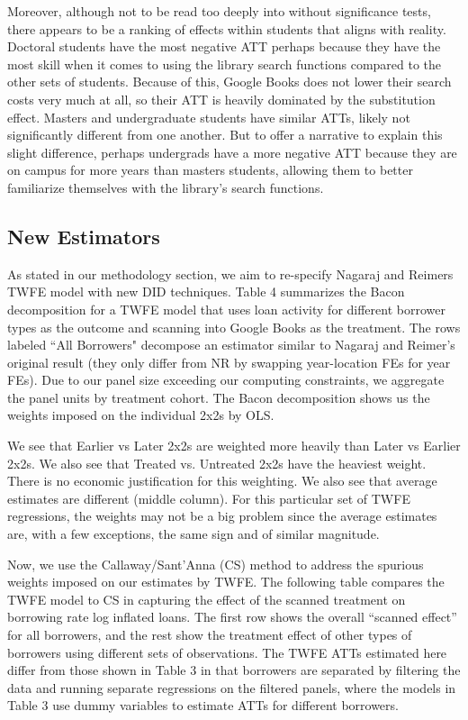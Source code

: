 \documentclass{article}
\begin{document}
Moreover, although not to be read too deeply into without significance tests, there appears to be a ranking of effects within students that aligns with reality. Doctoral students have the most negative ATT perhaps because they have the most skill when it comes to using the library search functions compared to the other sets of students. Because of this, Google Books does not lower their search costs very much at all, so their ATT is heavily dominated by the substitution effect. Masters and undergraduate students have similar ATTs, likely not significantly different from one another. But to offer a narrative to explain this slight difference, perhaps undergrads have a more negative ATT because they are on campus for more years than masters students, allowing them to better familiarize themselves with the library's search functions. 

\subsection{New Estimators}

As stated in our methodology section, we aim to re-specify Nagaraj and Reimers TWFE model with new DID techniques. Table 4 summarizes the Bacon decomposition for a TWFE model that uses loan activity for different borrower types as the outcome and scanning into Google Books as the treatment. The rows labeled ``All Borrowers" decompose an estimator similar to Nagaraj and Reimer's original result (they only differ from NR by swapping year-location FEs for year FEs). Due to our panel size exceeding our computing constraints, we aggregate the panel units by treatment cohort. The Bacon decomposition shows us the weights imposed on the individual 2x2s by OLS. 

We see that Earlier vs Later 2x2s are weighted more heavily than Later vs Earlier 2x2s. We also see that Treated vs. Untreated 2x2s have the heaviest weight. There is no economic justification for this weighting. We also see that average estimates are different (middle column).  For this particular set of TWFE regressions, the weights may not be a big problem since the average estimates are, with a few exceptions, the same sign and of similar magnitude. 

Now, we use the Callaway/Sant’Anna (CS) method to address the spurious weights imposed on our estimates by TWFE. The following table compares the TWFE model to CS in capturing the effect of the scanned treatment on borrowing rate log inflated loans. The first row shows the overall “scanned effect” for all borrowers, and the rest show the treatment effect of other types of borrowers using different sets of observations. The TWFE ATTs estimated here differ from those shown in Table 3 in that borrowers are separated by filtering the data and running separate regressions on the filtered panels, where the models in Table 3 use dummy variables to estimate ATTs for different borrowers. 

\end{document}
